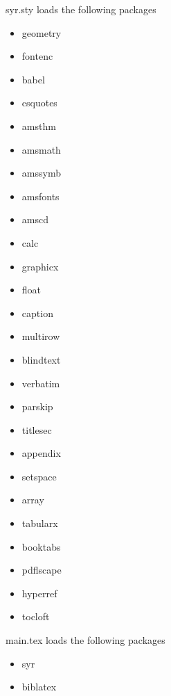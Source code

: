 
syr.sty loads the following packages
\begin{itemize}
\item geometry 
\item fontenc
\item babel
\item csquotes
\item amsthm
\item amsmath
\item amssymb
\item amsfonts
\item amscd
\item calc
\item graphicx
\item float
\item caption
\item multirow
\item blindtext
\item verbatim
\item parskip
\item titlesec
\item appendix
\item setspace
\item array
\item tabularx
\item booktabs
\item pdflscape
\item hyperref
\item tocloft
\end{itemize}

main.tex loads the following packages
\begin{itemize}
\item syr
\item biblatex
\end{itemize}